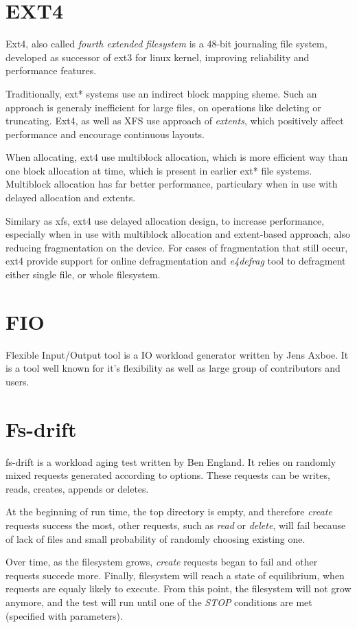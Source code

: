 \documentclass[
  color, %
  table, %
  lof,   %
  lot,   %
]{fithesis3}
\begin{document}
\section{EXT4}
Ext4, also called \textit{fourth extended filesystem} is a 48-bit journaling file system, developed as successor of ext3 for linux kernel, improving reliability and performance features.

Traditionally, ext* systems use an indirect block mapping sheme. Such an approach is generaly inefficient for large files, on operations like deleting or truncating. Ext4, as well as XFS use approach of \textit{extents}, which positively affect performance and encourage continuous layouts.

When allocating, ext4 use multiblock allocation, which is more efficient way than one block allocation at time, which is present in earlier ext* file systems. Multiblock allocation has far better performance, particulary when in use with delayed allocation and extents.

Similary as xfs, ext4 use delayed allocation design, to increase performance, especially when in use with multiblock allocation and extent-based approach, also reducing fragmentation on the device. For cases of fragmentation that still occur, ext4 provide support for online defragmentation and \textit{e4defrag} tool to defragment either single file, or whole filesystem.

\section{FIO}
Flexible Input/Output tool is a IO workload generator written by Jens Axboe. It is a tool well known for it's flexibility as well as large group of contributors and users.


\section{Fs-drift}
fs-drift is a workload aging test written by Ben England. It relies on randomly mixed requests generated according to options. These requests can be writes, reads, creates, appends or deletes.

At the beginning of run time, the top directory is empty, and therefore \textit{create} requests success the most, other requests, such as \textit{read} or \textit{delete}, will fail because of lack of files and small probability of randomly choosing existing one. 

Over time, as the filesystem grows, \textit{create} requests began to fail and other requests succede more. Finally, filesystem will reach a state of equilibrium, when requests are equaly likely to execute. From this point, the filesystem will not grow anymore, and the test will run until one of the \textit{STOP} conditions are met (specified with parameters).
\end{document}
